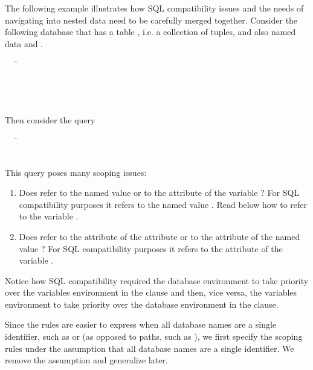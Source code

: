 \begin{example}
The following example illustrates how SQL compatibility issues and the needs of
navigating into nested data need to be carefully merged together. Consider the
following database that has a table , i.e. a collection of tuples, and
also named data  and .

\begin{tabbing}
\ \ \ \=\=\\
\>\>\\
\>\>\gt{\cb}\\
\>\\
\>
\end{tabbing}

Then consider the query
\begin{tabbing}
\ \ \ \=\\
\>\\
\>
\end{tabbing}

This query poses many scoping issues:
\begin{enumerate}
\item Does  refer to the named value  or to the  attribute
of the variable ? For SQL compatibility purposes it refers to the named
value . Read below how to refer to the variable .
\item Does  refer to the  attribute of the  attribute or to
the  attribute of the named value ? For SQL compatibility purposes
it refers to the  attribute of the variable .
\end{enumerate}
Notice how SQL compatibility required the database environment to take priority
over the variables environment in the  clause and then, vice versa, the
variables environment to take priority over the database environment in the
 clause.
\end{example}

Since the rules are easier to express when all database names are a single
identifier, such as  or  (as opposed to paths, such as
), we first specify the scoping rules under the assumption
that all database names are a single identifier. We remove the assumption and
generalize later.

